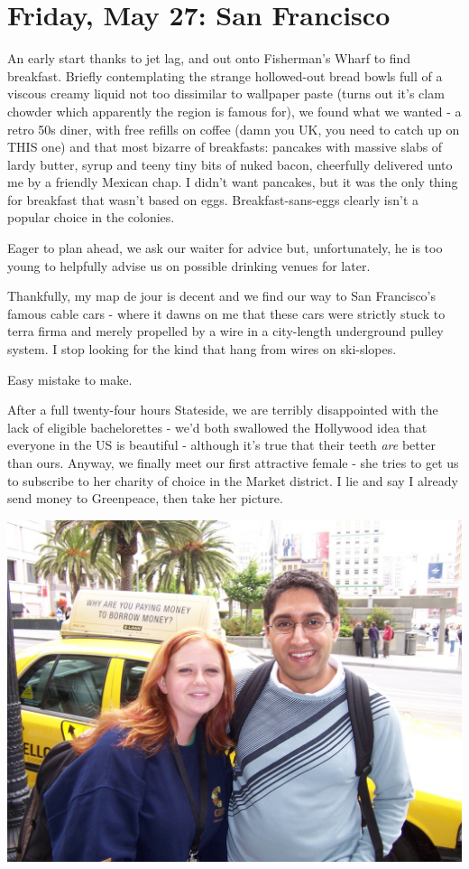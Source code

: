 \documentclass[a5paper,titlepage,11pt]{book}
\begin{document}
\chapter[San Francisco]{Friday, May 27: San Francisco}
An early start thanks to jet lag, and out onto Fisherman's Wharf to find breakfast. Briefly contemplating the strange hollowed-out bread bowls full of a viscous creamy liquid not too dissimilar to wallpaper paste (turns out it's clam chowder which apparently the region is famous for), we found what we wanted - a retro 50s diner, with free refills on coffee (damn you UK, you need to catch up on THIS one) and that most bizarre of breakfasts: pancakes with massive slabs of lardy butter, syrup and teeny tiny bits of nuked bacon, cheerfully delivered unto me by a friendly Mexican chap. I didn't want pancakes, but it was the only thing for breakfast that wasn't based on eggs. Breakfast-sans-eggs clearly isn't a popular choice in the colonies.

Eager to plan ahead, we ask our waiter for advice but, unfortunately, he is too young to helpfully advise us on possible drinking venues for later.

Thankfully, my map de jour is decent and we find our way to San Francisco's famous cable cars - where it dawns on me that these cars were strictly stuck to terra firma and merely propelled by a wire in a city-length underground pulley system. I stop looking for the kind that hang from wires on ski-slopes.

Easy mistake to make.

After a full twenty-four hours Stateside, we are terribly disappointed with the lack of eligible bachelorettes - we'd both swallowed the Hollywood idea that everyone in the US is beautiful - although it's true that their teeth \emph{are} better than ours. Anyway, we finally meet our first attractive female - she tries to get us to subscribe to her charity of choice in the Market district. I lie and say I already send money to Greenpeace, then take her picture.

\begin{center}\includegraphics[width=\textwidth]{gfx/100_1016}\end{center}
\end{document}
